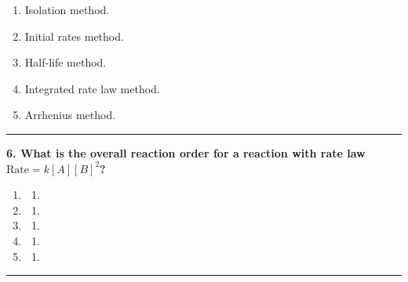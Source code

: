 \documentclass[
  9pt,
]{extbook}
\providecommand{\tightlist}{%
  \setlength{\itemsep}{0pt}\setlength{\parskip}{0pt}}
\theoremstyle{definition}
\theoremstyle{definition}
\theoremstyle{definition}
\theoremstyle{definition}
\theoremstyle{remark}
\begin{document}
\begin{enumerate}
\def\labelenumi{\alph{enumi}.}
\tightlist
\item
  Isolation method.
\item
  Initial rates method.
\item
  Half-life method.
\item
  Integrated rate law method.
\item
  Arrhenius method.
\end{enumerate}

\begin{center}\rule{0.5\linewidth}{0.5pt}\end{center}

\textbf{6. What is the overall reaction order for a reaction with rate law \(\text{Rate} = k[A][B]^2\)?}

\begin{enumerate}
\def\labelenumi{\alph{enumi}.}
\tightlist
\item
  \begin{enumerate}
  \def\labelenumii{\arabic{enumii}.}
  \setcounter{enumii}{2}
  \tightlist
  \item
  \end{enumerate}
\item
  \begin{enumerate}
  \def\labelenumii{\arabic{enumii}.}
  \setcounter{enumii}{1}
  \tightlist
  \item
  \end{enumerate}
\item
  \begin{enumerate}
  \def\labelenumii{\arabic{enumii}.}
  \tightlist
  \item
  \end{enumerate}
\item
  \begin{enumerate}
  \def\labelenumii{\arabic{enumii}.}
  \setcounter{enumii}{-1}
  \tightlist
  \item
  \end{enumerate}
\item
  \begin{enumerate}
  \def\labelenumii{\arabic{enumii}.}
  \setcounter{enumii}{3}
  \tightlist
  \item
  \end{enumerate}
\end{enumerate}

\begin{center}\rule{0.5\linewidth}{0.5pt}\end{center}
\end{document}
